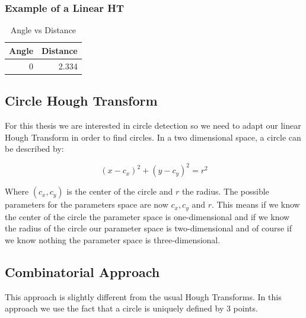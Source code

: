 \documentclass[10pt,twoside]{scrreprt}
\begin{document}
\subsubsection{Example of a Linear HT} %
\label{ssub:example_of_a_linear_ht}

\begin{table}
\centering
\caption{Angle vs Distance}
\begin{tabular}{rr}
\toprule
 Angle & Distance \\
\midrule
0 & 2.334 \\
\bottomrule
\end{tabular}
\end{table}



\subsection{Circle Hough Transform} %
\label{sub:circle_hough_transform}

For this thesis we are interested in circle detection so we need to adapt our linear Hough Transform in order to find circles. In a two dimensional space, a circle can be described by:

\begin{equation}
		(x-c_x)^2 + (y-c_y)^2 = r^2
\end{equation}

Where $(c_x,c_y)$ is the center of the circle and $r$ the radius. The possible parameters for the parameters space are now $c_x, c_y$ and $r$. This means if we know the center of the circle the parameter space is one-dimensional and if we know the radius of the circle our parameter space is two-dimensional and of course if we know nothing the parameter space is three-dimensional.


\subsection{Combinatorial Approach} %
\label{sub:combinatorial_approach}

This approach is slightly different from the usual Hough Transforms. In this approach we use the fact that a circle is uniquely defined by 3 points.
\end{document}
